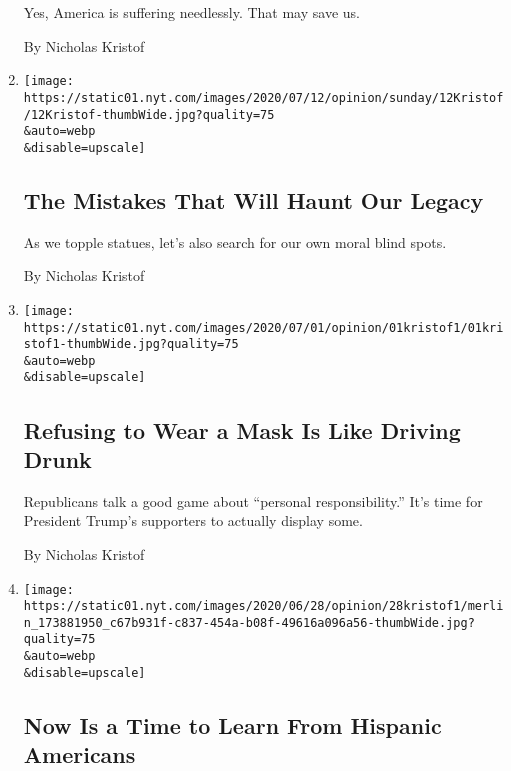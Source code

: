 \begin{enumerate}
  Yes, America is suffering needlessly. That may save us.

  By Nicholas Kristof
\item
  \href{/2020/07/11/opinion/sunday/animal-rights-cruelty.html}{}

  \texttt{[image: https://static01.nyt.com/images/2020/07/12/opinion/sunday/12Kristof/12Kristof-thumbWide.jpg?quality=75\\\&auto=webp\\\&disable=upscale]}

  \hypertarget{the-mistakes-that-will-haunt-our-legacy}{%
  \subsection{The Mistakes That Will Haunt Our
  Legacy}\label{the-mistakes-that-will-haunt-our-legacy}}

  As we topple statues, let's also search for our own moral blind spots.

  By Nicholas Kristof
\item
  \href{/2020/07/01/opinion/coronavirus-face-masks.html}{}

  \texttt{[image: https://static01.nyt.com/images/2020/07/01/opinion/01kristof1/01kristof1-thumbWide.jpg?quality=75\\\&auto=webp\\\&disable=upscale]}

  \hypertarget{refusing-to-wear-a-mask-is-like-driving-drunk}{%
  \subsection{Refusing to Wear a Mask Is Like Driving
  Drunk}\label{refusing-to-wear-a-mask-is-like-driving-drunk}}

  Republicans talk a good game about ``personal responsibility.'' It's
  time for President Trump's supporters to actually display some.

  By Nicholas Kristof
\item
  \href{/2020/06/27/opinion/sunday/hispanic-americans.html}{}

  \texttt{[image: https://static01.nyt.com/images/2020/06/28/opinion/28kristof1/merlin\_173881950\_c67b931f-c837-454a-b08f-49616a096a56-thumbWide.jpg?quality=75\\\&auto=webp\\\&disable=upscale]}

  \hypertarget{now-is-a-time-to-learn-from-hispanic-americans}{%
  \subsection{Now Is a Time to Learn From Hispanic
  Americans}\label{now-is-a-time-to-learn-from-hispanic-americans}}


\end{enumerate}
